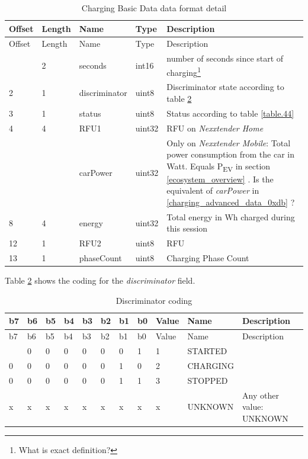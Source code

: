 \documentclass[a4paper]{article}
\newcommand{\secref}[1]{\ref{#1} \nameref{#1}}
\begin{document}
\hfill\break

\begin{longtable}[]{@{}llllp{10cm}@{}}
	\caption{Charging Basic Data data format detail}
	\label{table.42}
	\tabularnewline
	\toprule\noalign{}
	Offset & Length & Name          & Type   & Description                            \\
	\midrule\noalign{}
	\endfirsthead
	\toprule\noalign{}
	Offset & Length & Name          & Type   & Description                            \\
	\midrule\noalign{}
	\endhead
	\bottomrule\noalign{}
	\endlastfoot
	0      & 2      & seconds       & int16  & number of seconds since start of       
	charging\footnote{What is exact definition?} \\
	2      & 1      & discriminator & uint8  & Discriminator state according to table \secref{table.43} \\
	3      & 1      & status        & uint8  & Status according to table	\secref{table.44} \\
	4      & 4      & RFU1           & uint32 & RFU on \emph{Nexxtender Home}                                   \\
             &         & carPower     & uint32 & Only on \emph{Nexxtender Mobile}: 
           Total power consumption from the car in Watt. 
		Equals P\textsubscript{EV} in section \secref{ecosystem_overview}. 
           Is the equivalent of \emph{carPower} in  \secref{charging_advanced_data_0xdb}? \\
	8      & 4      & energy        & uint32 & Total energy in Wh charged during this session \\
	12     & 1      & RFU2           & uint8  & RFU                                    \\
	13     & 1      & phaseCount    & uint8  & Charging Phase Count                   \\
\end{longtable}

\hfill\break

Table \ref{table.43} shows the coding for the \emph{discriminator} field.

\begin{longtable}[]{@{}lllllllllll@{}}
	\caption{Discriminator coding}
	\label{table.43}
	\tabularnewline
	\toprule\noalign{}
	b7 & b6 & b5 & b4 & b3 & b2 & b1 & b0 & Value & Name     & Description      \\
	\midrule\noalign{}
	\endfirsthead
	\toprule\noalign{}
	b7 & b6 & b5 & b4 & b3 & b2 & b1 & b0 & Value & Name     & Description      \\
	\midrule\noalign{}
	\endhead
	\bottomrule\noalign{}
	\endlastfoot
	0  & 0  & 0  & 0  & 0  & 0  & 0  & 1  & 1     & STARTED  &                  \\
	0  & 0  & 0  & 0  & 0  & 0  & 1  & 0  & 2     & CHARGING &                  \\
	0  & 0  & 0  & 0  & 0  & 0  & 1  & 1  & 3     & STOPPED  &                  \\
	x  & x  & x  & x  & x  & x  & x  & x  & x     & UNKNOWN  & Any other value: 
	UNKNOWN \\
\end{longtable}
\end{document}
